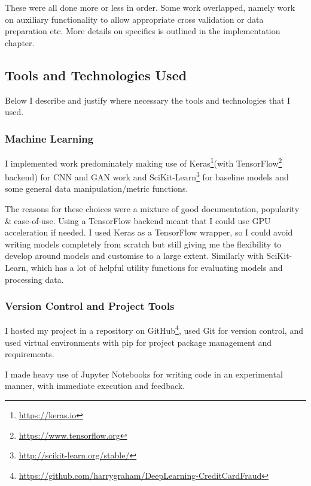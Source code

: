 \documentclass[12pt,a4paper,twoside]{report}
\begin{document}
 These were all done more or less in order. Some work overlapped, namely work on auxiliary functionality to allow appropriate cross validation or data preparation etc. More details on specifics is outlined in the implementation chapter. 
  
\subsection{Tools and Technologies Used} \label{tools}

Below I describe and justify where necessary the tools and technologies that I used.

\subsubsection{Machine Learning}

I implemented work predominately making use of Keras\footnote{\href{https://keras.io}{https://keras.io}}(with TensorFlow\footnote{\href{https://www.tensorflow.org}{https://www.tensorflow.org}} backend) for CNN and GAN work and SciKit-Learn\footnote{\href{ http://scikit-learn.org/stable/}{ http://scikit-learn.org/stable/}} for baseline models and some general data manipulation/metric functions. 

The reasons for these choices were a mixture of good documentation, popularity \& ease-of-use. Using a TensorFlow backend meant that I could use GPU acceleration if needed. I used Keras as a TensorFlow wrapper, so I could avoid writing models completely from scratch but still giving me the flexibility to develop around models and customise to a large extent. Similarly with SciKit-Learn, which has a lot of helpful utility functions for evaluating models and processing data.

\subsubsection{Version Control and Project Tools}

I hosted my project in a repository on GitHub\footnote{\href{https://github.com/harrygraham/DeepLearning-CreditCardFraud}{https://github.com/harrygraham/DeepLearning-CreditCardFraud}}, used Git for version control, and used virtual environments with pip for project package management and requirements.

I made heavy use of Jupyter Notebooks for writing code in an experimental manner, with immediate execution and feedback. 
\end{document}
